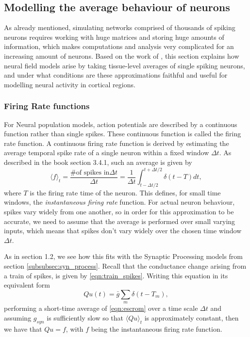 \documentclass{uonmathreport}
\begin{document}
\subsection{Modelling the average behaviour of neurons}\label{subsec:Modelling the average behaviour of neurons}

As already mentioned, simulating networks comprised of thousands of spiking neurons requires working with huge matrices and storing huge amounts of information, which makes computations and analysis very complicated for an increasing amount of neurons. Based on the work of \cite{coombes2012NeuralFields,bressloff2011spatiotemporal,CompNeuroSci}, this section explains how neural field models arise by taking tissue-level averages of single spiking neurons, and under what conditions are these approximations faithful and useful for modelling neural activity in cortical regions.

\subsubsection{Firing Rate functions}
\label{subsubsec:firing_rate_functions}

For Neural population models, action potentials are described by a continuous function rather than single spikes. These continuous function is called the firing rate function. A continuous firing rate function is derived by estimating the average temporal spike rate of a single neuron within a fixed window $\Delta t$. As described in the book \cite{CompNeuroSci} section 3.4.1, such an average is given by
\begin{equation}\label{eqn:time_average}
 \langle f \rangle_t = \frac{\text{\# of spikes in} \Delta t}{\Delta t} = \frac{1}{\Delta t}\int_{t-\Delta t/2}^{t+\Delta t/2} \delta(t - T) dt, 
\end{equation}
where $T$ is the firing rate time of the neuron. This defines, for small time windows, the \textit{instantaneous firing rate} function. For actual neuron behaviour, spikes vary widely from one another, so in order for this approximation to be accurate, we need to assume that the average is performed over small varying inputs, which means that spikes don't vary widely over the chosen time window $\Delta t$.

As in \cite{coombes2012NeuralFields} section 1.2, we see how this fits with the Synaptic Processing models from section \ref{subsubsec:syn_process}. Recall that the conductance change arising from a train
of spikes, is given by \ref{eqn:train_spikes}. Writing this equation in its equivalent form
\begin{equation} \label{eqn:escrom}
Qu(t) = \bar g \sum_m \delta(t-T_m),
\end{equation}
performing a short-time average of \ref{eqn:escrom} over a time scale $\Delta t$ and assuming $g_{syn}$ is sufficiently slow so that $\langle Qu \rangle_t$ is approximately constant, then we have that $Qu = f$, with $f$ being the instantaneous firing rate function.
\end{document}
